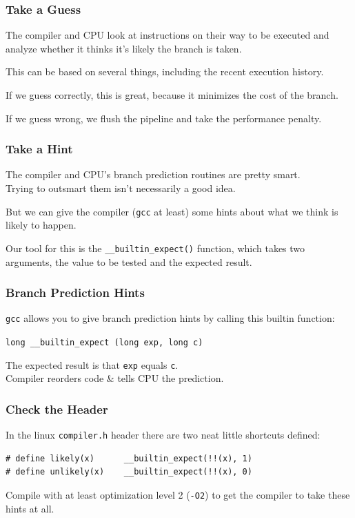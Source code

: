 \begin{frame}
\frametitle{Take a Guess}

The compiler and CPU look at instructions on their way to be executed and analyze whether it thinks it's likely the branch is taken. 

This can be based on several things, including the recent execution history. 

If we guess correctly, this is great, because it minimizes the cost of the branch. 

If we guess wrong, we flush the pipeline and take the performance penalty.

\end{frame}



\begin{frame}
\frametitle{Take a Hint}

The compiler and CPU's branch prediction routines are pretty smart.\\
\quad Trying to outsmart them isn't necessarily a good idea. 

But we can give the compiler (\texttt{gcc} at least) some hints about what we think is likely to happen. 

Our tool for this is the \texttt{\_\_builtin\_expect()} function, which takes two arguments, the value to be tested and the expected result.

\end{frame}


\begin{frame}[fragile]
  \frametitle{Branch Prediction Hints}

  
  {\tt gcc} allows you to give branch
  prediction hints by calling this builtin function:

  \begin{center}
    \verb+long __builtin_expect (long exp, long c)+
  \end{center}

  The expected result is that {\tt exp} equals {\tt c}.\\[1em]
  Compiler reorders code \& tells CPU the prediction.
  
  
\end{frame}



\begin{frame}[fragile]
\frametitle{Check the Header}

In the linux \texttt{compiler.h} header there are two neat little shortcuts defined:

\begin{verbatim}
# define likely(x)      __builtin_expect(!!(x), 1)
# define unlikely(x)    __builtin_expect(!!(x), 0)
\end{verbatim}

Compile with at least optimization level 2 (\texttt{-O2}) to get the compiler to take these hints at all.

\end{frame}



